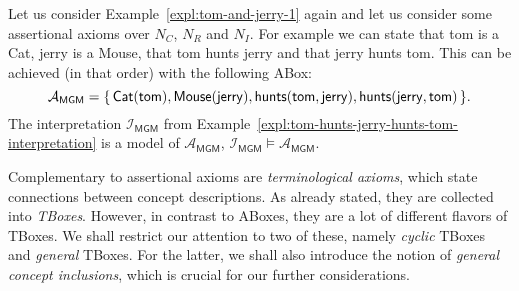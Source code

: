 \begin{Example}
  \label{expl:tom-and-jerry-ABox}
  Let us consider Example~\ref{expl:tom-and-jerry-1} again and let us consider some
  assertional axioms over $N_C$, $N_R$ and $N_I$.  For example we can state that
  \textsf{tom} is a \textsf{Cat}, \textsf{jerry} is a \textsf{Mouse}, that \textsf{tom}
  \textsf{hunts} \textsf{jerry} and that \textsf{jerry} \textsf{hunts} \textsf{tom}.  This
  can be achieved (in that order) with the following ABox:
  \begin{equation*}
    \mathcal{A}_{\mathsf{MGM}} = {\{\, \mathsf{Cat}(\mathsf{tom}), \mathsf{Mouse}(\mathsf{jerry}),
      \mathsf{hunts}(\mathsf{tom}, \mathsf{jerry}),
      \mathsf{hunts}(\mathsf{jerry}, \mathsf{tom}) \,\}}.
  \end{equation*}
  The interpretation $\mathcal{I}_{\mathsf{MGM}}$ from
  Example~\ref{expl:tom-hunts-jerry-hunts-tom-interpretation} is a model of
  $\mathcal{A}_{\mathsf{MGM}}$, \ie $\mathcal{I}_{\mathsf{MGM}} \models
  \mathcal{A}_{\mathsf{MGM}}$.
\end{Example}

Complementary to assertional axioms are \emph{terminological axioms}, which state
connections between concept descriptions.  As already stated, they are collected into
\emph{TBoxes}.  However, in contrast to ABoxes, they are a lot of different flavors of
TBoxes.  We shall restrict our attention to two of these, namely \emph{cyclic} TBoxes and
\emph{general} TBoxes.  For the latter, we shall also introduce the notion of
\emph{general concept inclusions}, which is crucial for our further considerations.

